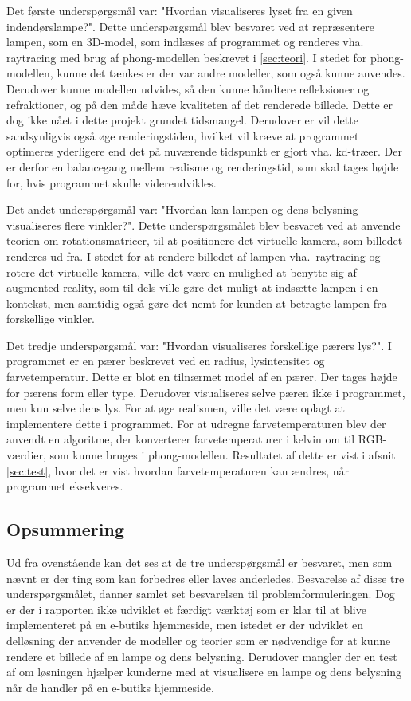 Det første underspørgsmål var: "Hvordan visualiseres lyset fra en given indendørslampe?". Dette underspørgsmål blev besvaret ved at repræsentere lampen, som en 3D-model, som indlæses af programmet og renderes vha. raytracing med brug af phong-modellen beskrevet i \ref{sec:teori}. I stedet for phong-modellen, kunne det tænkes er der var andre modeller, som også kunne anvendes. Derudover kunne modellen udvides, så den kunne håndtere refleksioner og refraktioner, og på den måde hæve kvaliteten af det renderede billede. Dette er dog ikke nået i dette projekt grundet tidsmangel. Derudover er vil dette sandsynligvis også øge renderingstiden, hvilket vil kræve at programmet optimeres yderligere end det på nuværende tidspunkt er gjort vha. kd-træer. Der er derfor en balancegang mellem realisme og renderingstid, som skal tages højde for, hvis programmet skulle videreudvikles.

Det andet underspørgsmål var: "Hvordan kan lampen og dens belysning visualiseres flere vinkler?". Dette underspørgsmålet blev besvaret ved at anvende teorien om rotationsmatricer, til at positionere det virtuelle kamera, som billedet renderes ud fra. I stedet for at rendere billedet af lampen vha.\ raytracing og rotere det virtuelle kamera, ville det være en mulighed at benytte sig af augmented reality, som til dels ville gøre det muligt at indsætte lampen i en kontekst, men samtidig også gøre det nemt for kunden at betragte lampen fra forskellige vinkler.

Det tredje underspørgsmål var: "Hvordan visualiseres forskellige pærers lys?". I programmet er en pærer beskrevet ved en radius, lysintensitet og farvetemperatur. Dette er blot en tilnærmet model af en pærer. Der tages højde for pærens form eller type. Derudover visualiseres selve pæren ikke i programmet, men kun selve dens lys. For at øge realismen, ville det være oplagt at implementere dette i programmet. 
For at udregne farvetemperaturen blev der anvendt en algoritme, der konverterer farvetemperaturer i kelvin om til RGB-værdier, som kunne bruges i phong-modellen. Resultatet af dette er vist i afsnit \ref{sec:test}, hvor det er vist hvordan farvetemperaturen kan ændres, når programmet eksekveres. 

\subsection*{Opsummering}
Ud fra ovenstående kan det ses at de tre underspørgsmål er besvaret, men som nævnt er der ting som kan forbedres eller laves anderledes. Besvarelse af disse tre underspørgsmålet, danner samlet set besvarelsen til problemformuleringen. Dog er der i rapporten ikke udviklet et færdigt værktøj som er klar til at blive implementeret på en e-butiks hjemmeside, men istedet er der udviklet en delløsning der anvender de modeller og teorier som er nødvendige for at kunne rendere et billede af en lampe og dens belysning. Derudover mangler der en test af om løsningen hjælper kunderne med at visualisere en lampe og dens belysning når de handler på en e-butiks hjemmeside. 


